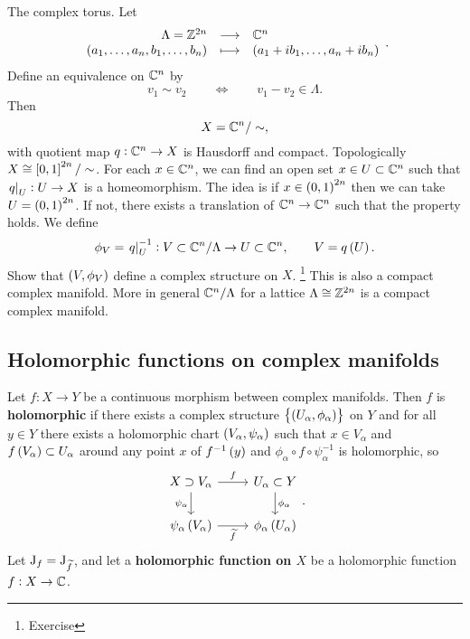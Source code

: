 \begin{example}
The complex torus. Let
$$ \function{\Lambda = \ZZ^{2n}}{\CC^n}{\br{a_1, \dots, a_n, b_1, \dots, b_n}}{\br{a_1 + ib_1, \dots, a_n + ib_n}}. $$
Define an equivalence on $ \mathbb{C}^n $ by
$$ v_1 \sim v_2 \qquad \iff \qquad v_1 - v_2 \in \Lambda. $$
Then
$$ X = \mathbb{C}^n / \sim, $$
with quotient map $ q : \mathbb{C}^n \to X $ is Hausdorff and compact. Topologically $ X \cong \sbr{0, 1}^{2n} / \sim $. For each $ x \in \mathbb{C}^n $, we can find an open set $ x \in U \subset \mathbb{C}^n $ such that $ \left. q \right|_U : U \to X $ is a homeomorphism. The idea is if $ x \in \br{0, 1}^{2n} $ then we can take $ U = \br{0, 1}^{2n} $. If not, there exists a translation of $ \mathbb{C}^n \to \mathbb{C}^n $ such that the property holds. We define
$$ \phi_V = \eval{q}_U^{-1} : V \subset \CC^n / \Lambda \to U \subset \CC^n, \qquad V = q\br{U}. $$
Show that $ \br{V, \phi_V} $ define a complex structure on $ X $. \footnote{Exercise} This is also a compact complex manifold. More in general $ \mathbb{C}^n / \Lambda $ for a lattice $ \Lambda \cong \mathbb{Z}^{2n} $ is a compact complex manifold.
\end{example}

\subsection{Holomorphic functions on complex manifolds}


\begin{definition}
Let $ f : X \to Y $ be a continuous morphism between complex manifolds. Then $ f $ is \textbf{holomorphic} if there exists a complex structure $ \cbr{\br{U_\alpha, \phi_\alpha}} $ on $ Y $ and for all $ y \in Y $ there exists a holomorphic chart $ \br{V_\alpha, \psi_\alpha} $ such that $ x \in V_\alpha $ and $ f\br{V_\alpha} \subset U_\alpha $ around any point $ x $ of $ f^{-1}\br{y} $ and $ \phi_\alpha \circ f \circ \psi_\alpha^{-1} $ is holomorphic, so
$$
\begin{tikzcd}
X \supset V_\alpha \arrow{r}{f} \arrow{d}[swap]{\psi_\alpha} & U_\alpha \subset Y \arrow{d}{\phi_\alpha} \\
\psi_\alpha\br{V_\alpha} \arrow{r}[swap]{\widetilde{f}} & \phi_\alpha\br{U_\alpha}
\end{tikzcd}.
$$
Let $ \mathrm{J}_f = \mathrm{J}_{\widetilde{f}} $, and let a \textbf{holomorphic function on $ X $} be a holomorphic function $ f : X \to \mathbb{C} $.
\end{definition}

